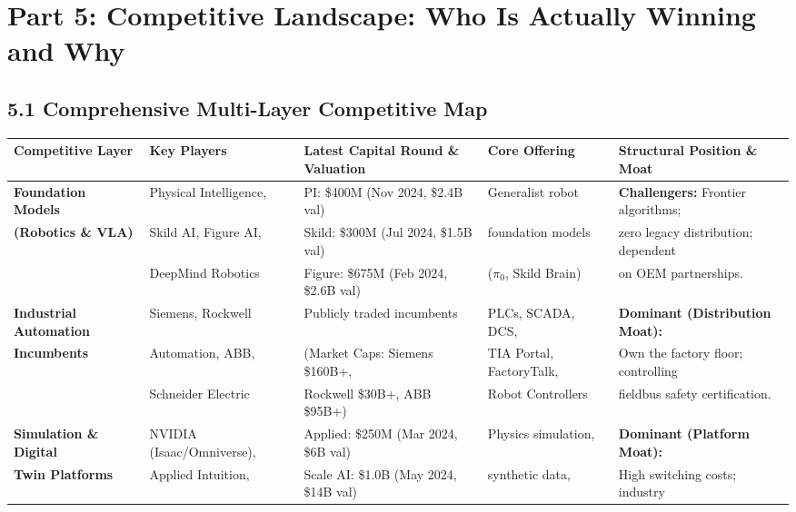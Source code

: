 \documentclass[11pt,a4paper]{article}
\begin{document}
\section{Part 5: Competitive Landscape: Who Is Actually Winning and Why}

\subsection{5.1 Comprehensive Multi-Layer Competitive Map}
\begin{table}[h!]
\centering
\scriptsize
\begin{tabularx}{\textwidth}{@{}l p{3.2cm} p{3.2cm} p{2.8cm} X@{}}
\toprule
\textbf{Competitive Layer} & \textbf{Key Players} & \textbf{Latest Capital Round \& Valuation} & \textbf{Core Offering} & \textbf{Structural Position \& Moat} \\
\midrule
\textbf{Foundation Models} & Physical Intelligence, & PI: \$400M (Nov 2024, \$2.4B val)\newline & Generalist robot & \textbf{Challengers:} Frontier algorithms; \\
\textbf{(Robotics \& VLA)} & Skild AI, Figure AI, & Skild: \$300M (Jul 2024, \$1.5B val)\newline & foundation models & zero legacy distribution; dependent \\
& DeepMind Robotics & Figure: \$675M (Feb 2024, \$2.6B val) & ($\pi_0$, Skild Brain) & on OEM partnerships. \\
\addlinespace
\textbf{Industrial Automation} & Siemens, Rockwell & Publicly traded incumbents & PLCs, SCADA, DCS, & \textbf{Dominant (Distribution Moat):} \\
\textbf{Incumbents} & Automation, ABB, & (Market Caps: Siemens \$160B+, & TIA Portal, FactoryTalk, & Own the factory floor; controlling \\
& Schneider Electric & Rockwell \$30B+, ABB \$95B+) & Robot Controllers & fieldbus safety certification. \\
\addlinespace
\textbf{Simulation \& Digital} & NVIDIA (Isaac/Omniverse), & Applied: \$250M (Mar 2024, \$6B val)\newline & Physics simulation, & \textbf{Dominant (Platform Moat):} \\
\textbf{Twin Platforms} & Applied Intuition, & Scale AI: \$1.0B (May 2024, \$14B val)\newline & synthetic data, & High switching costs; industry \\

\end{tabularx}
\end{table}
\end{document}
